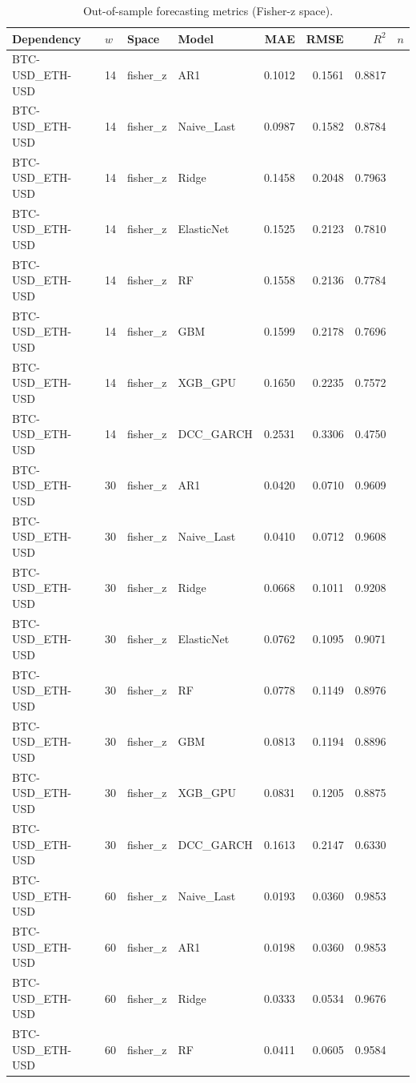 \begin{table}[H]
\centering
\small
\caption{Out-of-sample forecasting metrics (Fisher-z space).}
\label{tab:model_comparison}
\begin{tabular}{llllrrrr}
\toprule
Dependency & $w$ & Space & Model & MAE & RMSE & $R^2$ & $n$ \\
\midrule
BTC-USD_ETH-USD & 14 & fisher_z & AR1 & 0.1012 & 0.1561 & 0.8817 &  \\
BTC-USD_ETH-USD & 14 & fisher_z & Naive_Last & 0.0987 & 0.1582 & 0.8784 &  \\
BTC-USD_ETH-USD & 14 & fisher_z & Ridge & 0.1458 & 0.2048 & 0.7963 &  \\
BTC-USD_ETH-USD & 14 & fisher_z & ElasticNet & 0.1525 & 0.2123 & 0.7810 &  \\
BTC-USD_ETH-USD & 14 & fisher_z & RF & 0.1558 & 0.2136 & 0.7784 &  \\
BTC-USD_ETH-USD & 14 & fisher_z & GBM & 0.1599 & 0.2178 & 0.7696 &  \\
BTC-USD_ETH-USD & 14 & fisher_z & XGB_GPU & 0.1650 & 0.2235 & 0.7572 &  \\
BTC-USD_ETH-USD & 14 & fisher_z & DCC_GARCH & 0.2531 & 0.3306 & 0.4750 &  \\
BTC-USD_ETH-USD & 30 & fisher_z & AR1 & 0.0420 & 0.0710 & 0.9609 &  \\
BTC-USD_ETH-USD & 30 & fisher_z & Naive_Last & 0.0410 & 0.0712 & 0.9608 &  \\
BTC-USD_ETH-USD & 30 & fisher_z & Ridge & 0.0668 & 0.1011 & 0.9208 &  \\
BTC-USD_ETH-USD & 30 & fisher_z & ElasticNet & 0.0762 & 0.1095 & 0.9071 &  \\
BTC-USD_ETH-USD & 30 & fisher_z & RF & 0.0778 & 0.1149 & 0.8976 &  \\
BTC-USD_ETH-USD & 30 & fisher_z & GBM & 0.0813 & 0.1194 & 0.8896 &  \\
BTC-USD_ETH-USD & 30 & fisher_z & XGB_GPU & 0.0831 & 0.1205 & 0.8875 &  \\
BTC-USD_ETH-USD & 30 & fisher_z & DCC_GARCH & 0.1613 & 0.2147 & 0.6330 &  \\
BTC-USD_ETH-USD & 60 & fisher_z & Naive_Last & 0.0193 & 0.0360 & 0.9853 &  \\
BTC-USD_ETH-USD & 60 & fisher_z & AR1 & 0.0198 & 0.0360 & 0.9853 &  \\
BTC-USD_ETH-USD & 60 & fisher_z & Ridge & 0.0333 & 0.0534 & 0.9676 &  \\
BTC-USD_ETH-USD & 60 & fisher_z & RF & 0.0411 & 0.0605 & 0.9584 &  \\

\end{tabular}
\end{table}

